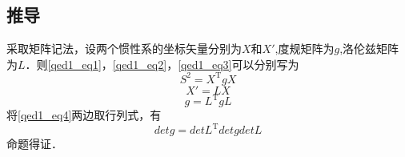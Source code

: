\subsection{推导}
采取矩阵记法，设两个惯性系的坐标矢量分别为$X$和$X'$,度规矩阵为$g$,洛伦兹矩阵为$L$．则\autoref{qed1_eq1}，\autoref{qed1_eq2}，\autoref{qed1_eq3}可以分别写为
\begin{equation}
S^{2}=X^{\mathrm{T}} g X
\end{equation}
\begin{equation}
X'=LX
\end{equation}
\begin{equation}\label{qed1_eq4}
g=L^{\mathrm{T}} g L
\end{equation}
将\autoref{qed1_eq4}两边取行列式，有
\begin{equation}
detg=detL^{\mathrm{T}} detg detL
\end{equation}
命题得证．
